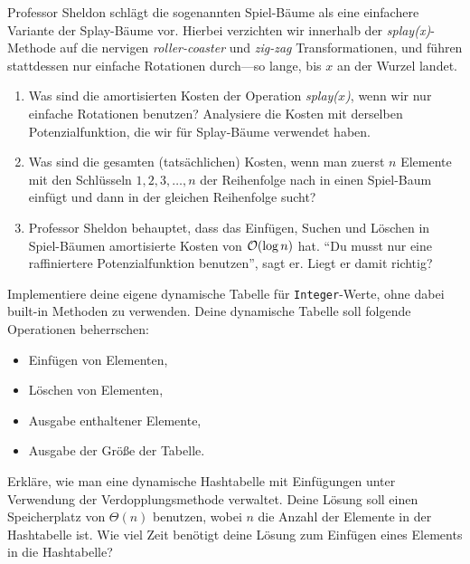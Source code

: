 \documentclass{uebung_cs}
\begin{document}
\begin{exercise}
	Professor Sheldon schlägt die sogenannten Spiel-Bäume als eine einfachere Variante der Splay-Bäume vor. Hierbei verzichten wir innerhalb der \emph{splay(x)}-Methode auf die nervigen \emph{roller-coaster} und \emph{zig-zag} Transformationen, und führen stattdessen nur einfache Rotationen durch---so lange, bis $x$ an der Wurzel landet.
	\begin{enumerate}
		\item Was sind die amortisierten Kosten der Operation \emph{splay($x$)}, wenn wir nur einfache Rotationen benutzen? Analysiere die Kosten mit derselben Potenzialfunktion, die wir für Splay-Bäume verwendet haben.
		\item Was sind die gesamten (tatsächlichen) Kosten, wenn man zuerst $n$ Elemente mit den Schlüsseln $1,2,3,\dots,n$ der Reihenfolge nach in einen Spiel-Baum einfügt und dann in der gleichen Reihenfolge sucht?
		\item Professor Sheldon behauptet, dass das Einfügen, Suchen und Löschen in Spiel-Bäumen amortisierte Kosten von $\mathcal{O}(\log n)$ hat. \enquote{Du musst nur eine raffiniertere Potenzialfunktion benutzen}, sagt er. Liegt er damit richtig?
	\end{enumerate}
\end{exercise}

\begin{exercise}
	Implementiere deine eigene dynamische Tabelle für \texttt{Integer}-Werte, ohne dabei built-in Methoden zu verwenden. Deine dynamische Tabelle soll folgende Operationen beherrschen:
	\begin{itemize}
		\item Einfügen von Elementen,
		\item Löschen von Elementen,
		\item Ausgabe enthaltener Elemente,
		\item Ausgabe der Größe der Tabelle.
	\end{itemize}
\end{exercise}

\begin{exercise}
	Erkläre, wie man eine dynamische Hashtabelle mit Einfügungen unter Verwendung der Verdopplungsmethode verwaltet. Deine Lösung soll einen Speicherplatz von $\Theta(n)$ benutzen, wobei $n$ die Anzahl der Elemente in der Hashtabelle ist. Wie viel Zeit benötigt deine Lösung zum Einfügen eines Elements in die Hashtabelle?
\end{exercise}
\end{document}
